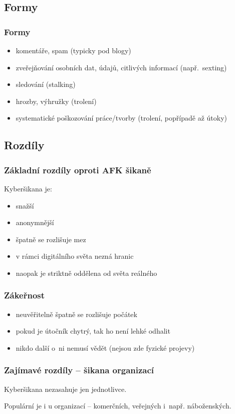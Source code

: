 \documentclass[xetex]{beamer}
\begin{document}
\subsection{Formy}

\begin{frame}
 \frametitle{Formy}
	\begin{itemize}
		\item komentáře, spam (typicky pod blogy)
		\item zveřejňování osobních dat, údajů, citlivých informací (např.~sexting)
		\item sledování (stalking)
		\item hrozby, výhružky (trolení)
		\item systematické poškozování práce/tvorby (trolení, popřípadě až útoky)
	\end{itemize} 
\end{frame}

\subsection{Rozdíly}

\begin{frame}
 \frametitle{Základní rozdíly oproti AFK šikaně}
 Kyberšikana je:
 \begin{itemize} 
		\item snažší
		\item anonymnější
		\item špatně se rozlišuje mez
		\item v rámci digitálního světa nezná hranic
		\item naopak je striktně oddělena od světa reálného
 \end{itemize}
\end{frame}

\begin{frame}
	\frametitle{Zákeřnost}
	\begin{itemize}
		\item neuvěřitelně špatně se rozlišuje počátek
		\item pokud je útočník chytrý, tak ho není lehké odhalit
		\item nikdo další o~ni nemusí vědět (nejsou zde fyzické projevy)
	\end{itemize}
\end{frame}

\begin{frame}
	\frametitle{Zajímavé rozdíly – šikana organizací}

	Kyberšikana nezasahuje jen jednotlivce.

	\bigskip

	Populární je i u organizací – komerčních, veřejných i~např. náboženských.
\end{frame}
\end{document}
